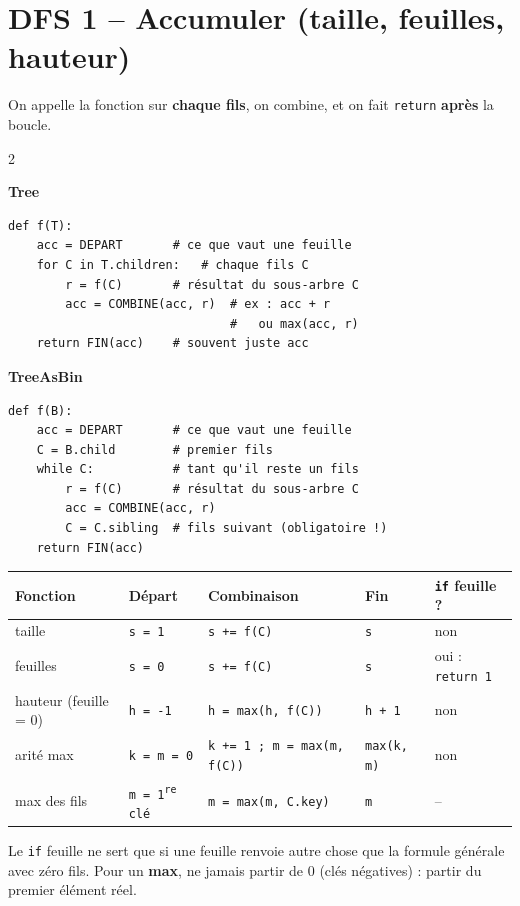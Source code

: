 \documentclass[10pt,a4paper]{article}
\newcommand{\code}[1]{\texttt{#1}}
\newcommand{\TREE}{\colorbox{treec}{\color{white}\strut\small\bfseries\ttfamily Tree}}
\newcommand{\TAB}{\colorbox{tabc}{\color{white}\strut\small\bfseries\ttfamily TreeAsBin}}
\newcommand{\sect}[1]{\section*{\color{theme}#1}}
\begin{document}
\sect{DFS 1 -- Accumuler (taille, feuilles, hauteur)}

On appelle la fonction sur \textbf{chaque fils}, on combine, et on fait \code{return} \textbf{apr\`es} la boucle.

\begin{multicols}{2}
\TREE
\begin{lstlisting}[style=tree]
def f(T):
    acc = DEPART       # ce que vaut une feuille
    for C in T.children:   # chaque fils C
        r = f(C)       # résultat du sous-arbre C
        acc = COMBINE(acc, r)  # ex : acc + r
                               #   ou max(acc, r)
    return FIN(acc)    # souvent juste acc
\end{lstlisting}
\columnbreak
\TAB
\begin{lstlisting}[style=tab]
def f(B):
    acc = DEPART       # ce que vaut une feuille
    C = B.child        # premier fils
    while C:           # tant qu'il reste un fils
        r = f(C)       # résultat du sous-arbre C
        acc = COMBINE(acc, r)
        C = C.sibling  # fils suivant (obligatoire !)
    return FIN(acc)
\end{lstlisting}
\end{multicols}

\begin{center}
\renewcommand{\arraystretch}{1.12}
\begin{tabular}{l l l l l}
\toprule
\textbf{Fonction} & \textbf{D\'epart} & \textbf{Combinaison} & \textbf{Fin} & \textbf{\code{if} feuille ?}\\
\midrule
taille & \code{s = 1} & \code{s += f(C)} & \code{s} & non\\
feuilles & \code{s = 0} & \code{s += f(C)} & \code{s} & oui : \code{return 1}\\
hauteur (feuille = 0) & \code{h = -1} & \code{h = max(h, f(C))} & \code{h + 1} & non\\
arit\'e max & \code{k = m = 0} & \code{k += 1 ; m = max(m, f(C))} & \code{max(k, m)} & non\\
max des fils & \code{m = 1\textsuperscript{re} cl\'e} & \code{m = max(m, C.key)} & \code{m} & -- \\
\bottomrule
\end{tabular}
\end{center}
{\small Le \code{if} feuille ne sert que si une feuille renvoie autre chose que la formule g\'en\'erale avec z\'ero fils. Pour un \textbf{max}, ne jamais partir de 0 (cl\'es n\'egatives) : partir du premier \'el\'ement r\'eel.}
\end{document}

